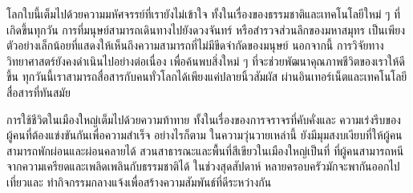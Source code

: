 \documentclass{article}
\begin{document}
โลกใบนี้เต็มไปด้วยความมหัศจรรย์ที่เรายังไม่เข้าใจ 
ทั้งในเรื่องของธรรมชาติและเทคโนโลยีใหม่ ๆ 
ที่เกิดขึ้นทุกวัน การที่มนุษย์สามารถเดินทางไปยังดวงจันทร์
หรือสำรวจส่วนลึกของมหาสมุทร 
เป็นเพียงตัวอย่างเล็กน้อยที่แสดงให้เห็นถึงความสามารถที่ไม่มีขีดจำกัดของมนุษย์ 
นอกจากนี้ การวิจัยทางวิทยาศาสตร์ยังคงดำเนินไปอย่างต่อเนื่อง 
เพื่อค้นพบสิ่งใหม่ ๆ 
ที่จะช่วยพัฒนาคุณภาพชีวิตของเราให้ดีขึ้น 
ทุกวันนี้เราสามารถสื่อสารกับคนทั่วโลกได้เพียงแค่ปลายนิ้วสัมผัส 
ผ่านอินเทอร์เน็ตและเทคโนโลยีสื่อสารที่ทันสมัย

การใช้ชีวิตในเมืองใหญ่เต็มไปด้วยความท้าทาย 
ทั้งในเรื่องของการจราจรที่คับคั่งและ
ความเร่งรีบของผู้คนที่ต้องแข่งขันกันเพื่อความสำเร็จ 
อย่างไรก็ตาม ในความวุ่นวายเหล่านี้ 
ยังมีมุมสงบเงียบที่ให้ผู้คนสามารถพักผ่อนและผ่อนคลายได้ 
สวนสาธารณะและพื้นที่สีเขียวในเมืองใหญ่เป็นที่
ที่ผู้คนสามารถหนีจากความเครียดและเพลิดเพลินกับธรรมชาติได้ 
ในช่วงสุดสัปดาห์ 
หลายครอบครัวมักจะพากันออกไปเที่ยวและ
ทำกิจกรรมกลางแจ้งเพื่อสร้างความสัมพันธ์ที่ดีระหว่างกัน
\end{document}
